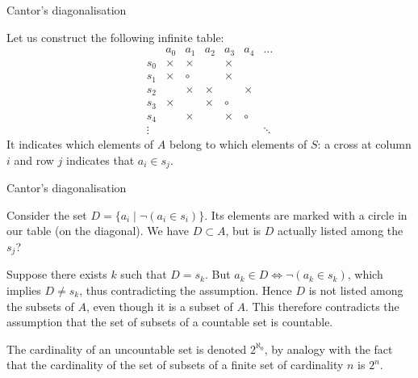 \documentclass[compress,dvips,xcolor={dvipsnames},t]{beamer}
\begin{document}
%
\begin{frame}{Cantor's diagonalisation}

Let us construct the following infinite table:
\[
\begin{array}{c|cccccc}
       & a_0    & a_1    & a_2    & a_3   & a_4      & \ldots\\
\hline
s_0    & \times & \times &        & \times \\
s_1    & \times & \circ  &        & \times \\
s_2    &        & \times & \times &        & \times\\
s_3    & \times &        & \times & \circ  & \\
s_4    &        & \times &        & \times & \circ\\
\vdots &        &        &        &        &         & \ddots
\end{array}
\]
It indicates which elements of $A$ belong to which elements of $S$:
a cross at column $i$ and row $j$ indicates that $a_i \in s_j$.

\end{frame}

%
\begin{frame}{Cantor's diagonalisation}

Consider the set $D = \{a_i \mid \neg(a_i \in s_i)\}$. Its elements
are marked with a circle in our table (on the diagonal). We have
$D \subset A$, but is $D$ actually listed among the $s_j$?

\bigskip

Suppose there exists $k$ such that $D = s_k$. But $a_k \in D
\Leftrightarrow \neg(a_k \in s_k)$, which implies $D \neq s_k$,
thus contradicting the assumption. Hence $D$ is not listed among the
subsets of $A$, even though it is a subset of $A$. This therefore
contradicts the assumption that the set of subsets of a countable
set is countable.

\bigskip

The cardinality of an uncountable set is denoted $2^{\aleph_0}$, by
analogy with the fact that the cardinality of the set of subsets of
a finite set of cardinality $n$ is $2^n$.

\end{frame}
\end{document}
